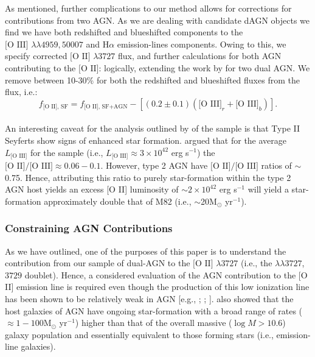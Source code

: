 As mentioned, further complications to our method allows for corrections for contributions from two AGN. As we are dealing with candidate dAGN objects we find we have both redshifted and blueshifted components to the $\text{[O III] }\lambda\lambda4959,50007$ and $\text{H}\alpha$ emission-lines components. Owing to this, we specify corrected $\text{[O II] }\lambda3727$ flux, and further calculations for both AGN contributing to the $\text{[O II]}$: logically, extending the work by \cite{2006ApJ...642..702K} for two dual AGN. We remove between 10-30\% for both the redshifted and blueshifted \text{[O III]} fluxes from the \text{[O II]} flux, i.e.:
\\
\begin{equation}
\label{eq:KimCorrection}
f_{\text{[O II], SF}}=f_{\text{[O II], SF+AGN}}-\left[(0.2\pm{0.1})(\text{[O III]}_r+\text{[O III]}_b)\right].
\end{equation}
\\
An interesting caveat for the analysis outlined by \cite{2006ApJ...642..702K} of the \cite{Zakamska2003} sample is that Type II Seyferts show signs of enhanced star formation. \cite{2006ApJ...642..702K} argued that for the average $L_{\text{[O III]}}$ for the \cite{Zakamska2003} sample (i.e., $L_{\text{[O III]}}\approx{3\times{10^{42}}}$ erg s$^{-1}$) the $\text{[O II]/[O III]}\approx{0.06-0.1}$. However, type 2 AGN have $\text{[O II]/[O III]}$ ratios of $\sim$0.75. Hence, attributing this ratio to purely star-formation within the type 2 AGN host yields an excess [O II] luminosity of $\sim{2\times{10^{42}}}$ erg s$^{-1}$ will yield a star-formation approximately double that of M82 (i.e., $\sim$20M$_{\odot}$ yr$^{-1}$).

\subsubsection{Constraining AGN Contributions}

As we have outlined, one of the purposes of this paper is to understand the contribution from our sample of dual-AGN to the $\text{[O II]}$ $\lambda{3727}$ (i.e., the $\lambda\lambda{3727}$,$3729$ doublet). Hence, a considered evaluation of the AGN contribution to the [O II] emission line is required even though the production of this low ionization line has been shown to be relatively weak in AGN [e.g., \cite{Ferland_1986}; \cite{Ho_1993}; \cite{2006ApJ...642..702K}]. \cite{2009ApJ...696..396S} also showed that the host galaxies of AGN have ongoing star-formation with a broad range of rates ($\approx{1-100}$M$_{\odot}$ yr$^{-1}$) higher than that of the overall massive ($\log{M}>{10.6}$) galaxy population and essentially equivalent to those forming stars (i.e., emission-line galaxies).
